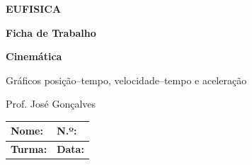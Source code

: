 \documentclass[11pt,a4paper]{article}
\begin{document}
	
	
	\begin{center}
		
		{\Huge\bfseries\textcolor{eufblue}{EUFISICA}}
		
		\vspace{1mm}
		
		{\Large\bfseries Ficha de Trabalho}
		
		\vspace{1mm}
		
		{\LARGE\bfseries Cinemática}
		
		\vspace{1mm}
		
		{\large
			Gráficos posição--tempo, velocidade--tempo e aceleração
		}
		
		\vspace{2mm}
		
		{\small Prof. José Gonçalves}
		
	\end{center}
	
	\vspace{2mm}
	
	\begin{tabularx}{\textwidth}{|X|X|}
		\hline
		\textbf{Nome:} & \textbf{N.º:} \\[0.45cm]
		\hline
		\textbf{Turma:} & \textbf{Data:} \\[0.45cm]
		\hline
	\end{tabularx}
	
	\vspace{4mm}
	
	
\end{document}
